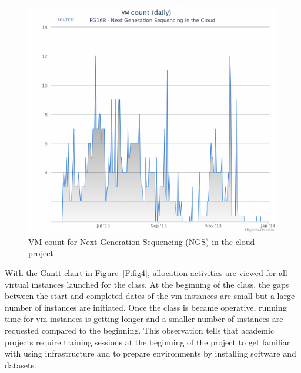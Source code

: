\documentclass{sig-alternate}
\begin{document}

\begin{figure}[h!] 
  \centering 
    \includegraphics[width=1.0\columnwidth]{images/fig2.pdf} 
  \caption{VM count for Next Generation Sequencing (NGS) in the cloud project}\label{F:fig3} 
\end{figure} 

With the Gantt chart in Figure~\ref{F:fig4}, allocation activities are viewed for all virtual instances launched for the class. At the beginning of the class, the gaps between the start and completed dates of the vm instances are small but a large number of instances are initiated. Once the class is became operative,  running time for vm instances is getting longer and a smaller number of instances are requested compared to the beginning. This observation tells that academic projects require training sessions at the beginning of the project to get familiar with using infrastructure and to prepare environments by installing software and datasets.
\end{document}
